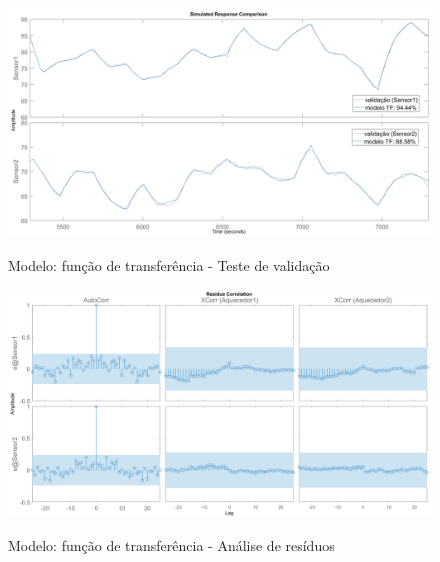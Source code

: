 \begin{apendicesenv}
\begin{figure}
	\caption{Modelo: função de transferência - Teste de validação}
	\begin{center}
		\includegraphics[width=1.00\textwidth]{./5_images/tclabsp-models-TF-compare.png} 
		\label{fig:tclabsp-models-tf-compare}
	\end{center}
	\centering
\end{figure}

\begin{figure}
	\caption{Modelo: função de transferência - Análise de resíduos}
	\begin{center}
		\includegraphics[width=1.00\textwidth]{./5_images/tclabsp-models-TF-resid.png} 
		\label{fig:tclabsp-models-tf-resid}
	\end{center}
	\centering
\end{figure}


\end{apendicesenv}
